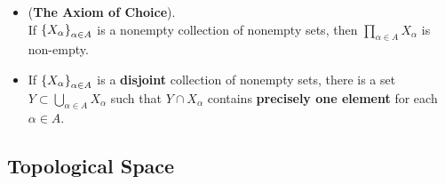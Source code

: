 \documentclass[11pt]{article}
\begin{document}
\begin{itemize}
\item \begin{principle} (\textbf{The Axiom of Choice}).\\
If $\left\{X_{\alpha}\right\}_{\alpha \in A}$ is a nonempty collection of nonempty sets, then $\prod_{\alpha \in A}X_{\alpha}$ is non-empty.
\end{principle}

\item \begin{corollary}
If $\left\{X_{\alpha}\right\}_{\alpha \in A}$ is a \textbf{disjoint} collection of nonempty sets, there is a set $Y \subset \bigcup_{\alpha \in A}X_{\alpha}$ such that $Y \cap X_{\alpha}$ contains \textbf{precisely one element} for each $\alpha \in A$.
\end{corollary}
\end{itemize}
\subsection{Topological Space}
\end{document}
